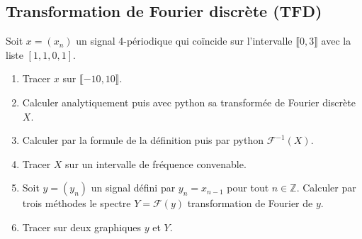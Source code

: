 \documentclass{article}
\begin{document}
\subsection*{Transformation de Fourier discrète (TFD)}
Soit $x=(x_n)$ un signal 4-périodique qui coïncide sur l'intervalle $\llbracket0,3\rrbracket$ avec la liste $[1,1,0,1]$.
\begin{enumerate}
\item Tracer $x$ sur $\llbracket-10,10\rrbracket$.
\item Calculer analytiquement puis avec python sa transformée de Fourier discrète $X$.
\item Calculer par la formule de la définition puis par python $\mathcal{F}^{-1}(X)$.
\item Tracer $X$ sur un intervalle de fréquence convenable.
\item Soit $y=(y_n)$ un signal défini par $y_n=x_{n-1}$ pour tout $n\in \mathbb{Z}$. Calculer par trois méthodes le spectre $Y=\mathcal{F}(y)$ transformation de Fourier de $y$.
\item Tracer sur deux graphiques $y$ et $Y$.
\end{enumerate}
\end{document}
